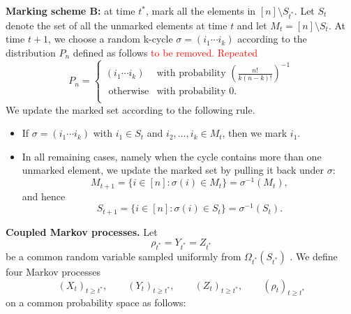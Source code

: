 \noindent\textbf{Marking scheme B:} at time $t^*$, mark all the elements in $[n] \setminus S_{t^*}$. Let $S_t$ denote the set of all the unmarked elements at time $t$ and let $M_t = [n] \setminus S_t$. At time $t + 1$, we choose a random k-cycle $\sigma = (i_1 \cdots i_k)$ according to the distribution $P_{n}$ defined as follows
\textcolor{red}{to be removed. Repeated}
    \[
P_{n}=\begin{cases}
(i_1 \cdots i_k) & \text{with probability } \left( \frac{n!}{k(n-k)!} \right)^{-1}\\
\text{ otherwise} & \text{with probability } 0.\\[6pt]
\end{cases}
\]
We update the marked set according to the following rule.
\begin{itemize}
    \item If $\sigma=(i_1\cdots i_k)$ with $i_1\in S_t$ and
$i_2,\ldots,i_k\in M_t$, then we mark $i_1$.
\item In all remaining cases, namely when the cycle contains more than one unmarked element, we update the marked set by pulling it back under $\sigma$:
\[
    M_{t+1}
    =
    \{i\in[n]:\sigma(i)\in M_t\}
    =
    \sigma^{-1}(M_t),
\]
and hence
\[
    S_{t+1}
    =
    \{i\in[n]:\sigma(i)\in S_t\}
    =
    \sigma^{-1}(S_t).
\]
\end{itemize}
\noindent\textbf{Coupled Markov processes.}
Let
\[
    \rho_{t^*}=Y_{t^*}=Z_{t^*}
\]
be a common random variable sampled uniformly from $\Omega_{t^*}(S_{t^*})$ . We define four Markov processes
\[
    (X_t)_{t\geq t^*},\qquad
    (Y_t)_{t\geq t^*},\qquad
    (Z_t)_{t\geq t^*},\qquad
    (\rho_t)_{t\geq t^*}
\]
on a common probability space as follows:
